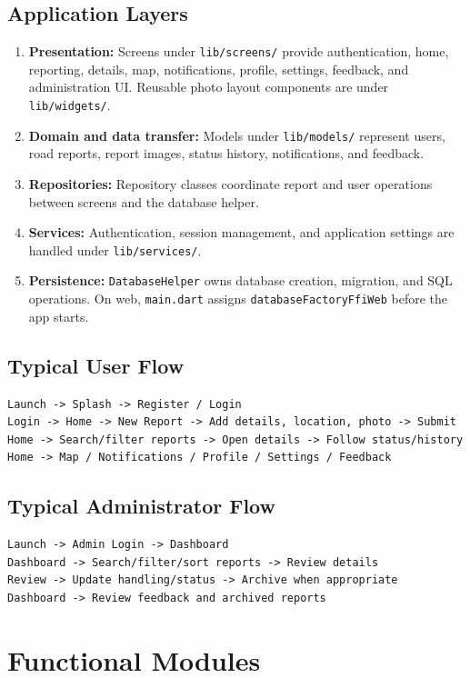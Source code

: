 \documentclass[12pt,a4paper]{report}
\begin{document}
\section{Application Layers}
\begin{enumerate}
  \item \textbf{Presentation:} Screens under \texttt{lib/screens/} provide authentication, home, reporting, details, map, notifications, profile, settings, feedback, and administration UI. Reusable photo layout components are under \texttt{lib/widgets/}.
  \item \textbf{Domain and data transfer:} Models under \texttt{lib/models/} represent users, road reports, report images, status history, notifications, and feedback.
  \item \textbf{Repositories:} Repository classes coordinate report and user operations between screens and the database helper.
  \item \textbf{Services:} Authentication, session management, and application settings are handled under \texttt{lib/services/}.
  \item \textbf{Persistence:} \texttt{DatabaseHelper} owns database creation, migration, and SQL operations. On web, \texttt{main.dart} assigns \texttt{databaseFactoryFfiWeb} before the app starts.
\end{enumerate}

\section{Typical User Flow}
\begin{lstlisting}
Launch -> Splash -> Register / Login
Login -> Home -> New Report -> Add details, location, photo -> Submit
Home -> Search/filter reports -> Open details -> Follow status/history
Home -> Map / Notifications / Profile / Settings / Feedback
\end{lstlisting}

\section{Typical Administrator Flow}
\begin{lstlisting}
Launch -> Admin Login -> Dashboard
Dashboard -> Search/filter/sort reports -> Review details
Review -> Update handling/status -> Archive when appropriate
Dashboard -> Review feedback and archived reports
\end{lstlisting}

\chapter{Functional Modules}
\end{document}
